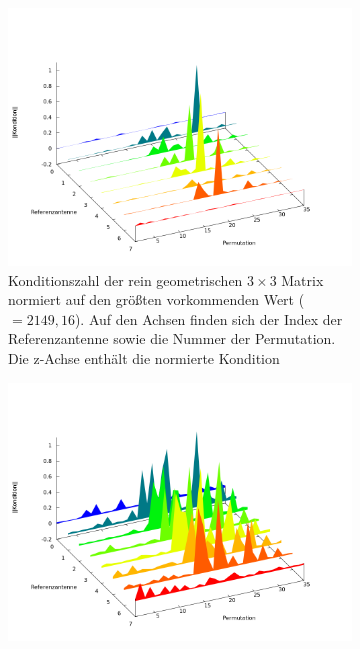 \begin{figure}[h!]
         \centering
	     \caption[Ergebnisse der Konditionsanalyse alle Permutationen]{Analyse der Konditionszahlen aller möglichen Matrizen für den Messaufbau. Die Konditionszahl ist für jede mögliche Permutation an Messantennen für eine Referenzantenne angegeben}\label{fig:CondNumberAnalyze}
         \begin{subfigure}[t]{0.45\textwidth}
                 \centering
                 \includegraphics[width=\textwidth]{img/fenceModell3x3.png}
                 \caption{Konditionszahl der rein geometrischen $3\times3$ Matrix normiert auf den größten vorkommenden Wert ($=2149,16$). Auf den Achsen finden sich der Index der Referenzantenne sowie die Nummer der Permutation. Die z-Achse enthält die normierte Kondition}
                 \label{fig:AnalyzeOf3x3}
         \end{subfigure}
\qquad        
         \begin{subfigure}[t]{0.45\textwidth}
                 \centering
                 \includegraphics[width=\textwidth]{img/fenceModell9x3.png}

\end{subfigure}
\end{figure}
